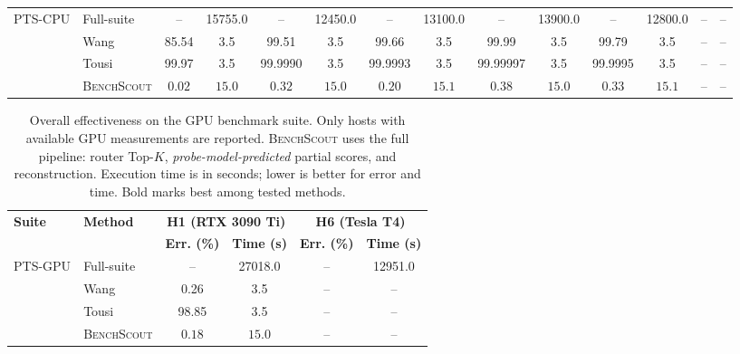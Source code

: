 \documentclass[sigplan,10pt]{acmart}
\newcommand{\ourmethod}{\textsc{BenchScout}\xspace}
\newcommand{\ptscpu}{PTS-CPU}
\newcommand{\ptsgpu}{PTS-GPU}
\begin{document}
\begin{table}[t]
\begin{tabular}{llcccccccccccc}
\midrule

\multirow{4}{*}{\ptscpu} 
& Full-suite & -- & 15755.0 & -- & 12450.0 & -- & 13100.0 & -- & 13900.0 & -- & 12800.0 & -- & -- \\
& Wang~\cite{wang2019predicting} & 85.54 & 3.5 & 99.51 & 3.5 & 99.66 & 3.5 & 99.99 & 3.5 & 99.79 & 3.5 & -- & -- \\
& Tousi~\cite{tousi2022comparative} & 99.97 & 3.5 & 99.9990 & 3.5 & 99.9993 & 3.5 & 99.99997 & 3.5 & 99.9995 & 3.5 & -- & -- \\
& \ourmethod & $\mathbf{0.02}$ & $\mathbf{15.0}$ & $\mathbf{0.32}$ & $\mathbf{15.0}$ & $\mathbf{0.20}$ & $\mathbf{15.1}$ & $\mathbf{0.38}$ & $\mathbf{15.0}$ & $\mathbf{0.33}$ & $\mathbf{15.1}$ & -- & -- \\

\bottomrule
\end{tabular}
\end{table}



\begin{table}[t]
\centering
\caption{Overall effectiveness on the GPU benchmark suite.
Only hosts with available GPU measurements are reported.
\ourmethod{} uses the full pipeline: router Top-$K$, \emph{probe-model-predicted} partial scores, and reconstruction.
Execution time is in seconds; lower is better for error and time. Bold marks best among tested methods.}
\label{tab:overall-effectiveness-gpu}
\footnotesize
\setlength{\tabcolsep}{4.5pt}
\begin{tabular}{llcccc}
\toprule
\multirow{2}{*}{\textbf{Suite}} & \multirow{2}{*}{\textbf{Method}} & \multicolumn{2}{c}{\textbf{H1 (RTX 3090 Ti)}} & \multicolumn{2}{c}{\textbf{H6 (Tesla T4)}} \\
\cmidrule(lr){3-4} \cmidrule(lr){5-6}
& & \textbf{Err. (\%)} & \textbf{Time (s)} & \textbf{Err. (\%)} & \textbf{Time (s)} \\
\midrule
\multirow{4}{*}{\ptsgpu}
& Full-suite & -- & 27018.0 & -- & 12951.0 \\
& Wang~\cite{wang2019predicting} & 0.26 & 3.5 & -- & -- \\
& Tousi~\cite{tousi2022comparative} & 98.85 & 3.5 & -- & -- \\
& \ourmethod & $\mathbf{0.18}$ & $\mathbf{15.0}$ & -- & -- \\
\bottomrule
\end{tabular}
\end{table}


\end{document}
